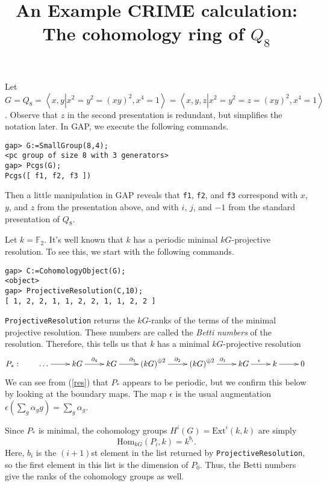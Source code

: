 \documentclass[12pt]{article}
\title{An Example \textsf{CRIME} calculation: 
The cohomology ring of $Q_8$}\author{}
\begin{document}
\maketitle

Let $G=Q_8=\left\langle x,y\left|
x^2=y^2=\left(xy\right)^2,x^4=1\right.\right\rangle
=\left\langle x,y,z\left|
x^2=y^2=z=\left(xy\right)^2,x^4=1\right.\right\rangle$.
Observe that $z$ in the second presentation is redundant,
but simplifies the notation later. In \textsf{GAP}, we execute
the following commands.
\begin{verbatim}
gap> G:=SmallGroup(8,4);
<pc group of size 8 with 3 generators>
gap> Pcgs(G);
Pcgs([ f1, f2, f3 ])
\end{verbatim}
Then a little manipulation in \textsf{ GAP}
reveals that \verb!f1!, \verb!f2!, and \verb!f3!
correspond with $x$, $y$, and $z$
from the presentation above, and with $i$,
$j$, and $-1$ from the standard presentation 
of $Q_8$.

Let $k=\mathbb{F}_2$. It's well known that $k$
has a periodic minimal $kG$-projective resolution.
To see this, we start with the following commands.

\begin{verbatim}
gap> C:=CohomologyObject(G);
<object>
gap> ProjectiveResolution(C,10);
[ 1, 2, 2, 1, 1, 2, 2, 1, 1, 2, 2 ]
\end{verbatim}

\verb!ProjectiveResolution! returns the $kG$-ranks
of the terms of the minimal projective resolution.
These numbers are called the {\em Betti numbers}
of the resolution.
Therefore, this tells us that $k$ has a minimal 
$kG$-projective resolution 
\begin{equation}\label{res}
P_\ast:\qquad\begin{xy}\xymatrix{
\dots\ar[r]&kG\ar[r]^{\partial_4}
&kG\ar[r]^{\partial_3}
&\left(kG\right)^{\oplus 2}\ar[r]^{\partial_2}
&\left(kG\right)^{\oplus 2}\ar[r]^{\partial_1}
&kG\ar[r]^{\epsilon}
&k\ar[r]&0
}\end{xy}\end{equation}
We can see from (\ref{res}) that $P_\ast$ 
appears to be periodic, but we
confirm this below by looking at the boundary maps.
The map $\epsilon$ is the usual augmentation
$\epsilon\left(\sum_g\alpha_gg\right)
=\sum_g\alpha_g$.

Since $P_\ast$ is minimal, 
the cohomology groups $H^i\left(G\right)
=\mathrm{Ext}^i\left(k,k\right)$ are simply
\[\mathrm{Hom}_{kG}\left(P_i,k\right)=k^{b_i}.\]
Here, $b_i$ is the $\left(i+1\right)$st element
in the list returned by \verb!ProjectiveResolution!,
so the first element in this list is the dimension
of $P_0$. Thus, the Betti numbers give the 
ranks of the cohomology groups as well.
\end{document}

